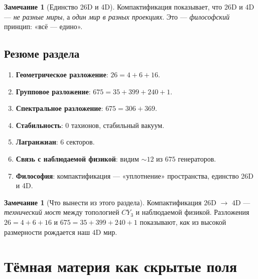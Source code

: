 \documentclass[11pt,a4paper]{article}
\newcommand{\CY}{CY_3}
\theoremstyle{definition}
\newtheorem{remark}[theorem]{Замечание}
\begin{document}
\begin{remark}[Единство 26D и 4D]
\label{rem:unity-26-4}
Компактификация показывает, что $26$D и $4$D — 
\emph{не разные миры}, а \emph{один мир в разных проекциях}. 
Это — \emph{философский} принцип: «всё — едино».
\end{remark}

\subsection{Резюме раздела}
\label{subsec:comp-summary}

\begin{enumerate}
    \item \textbf{Геометрическое разложение}: $26 = 4 + 6 + 16$.
    \item \textbf{Групповое разложение}: 
          $675 = 35 + 399 + 240 + 1$.
    \item \textbf{Спектральное разложение}: 
          $675 = 306 + 369$.
    \item \textbf{Стабильность}: $0$ тахионов, стабильный вакуум.
    \item \textbf{Лагранжиан}: $6$ секторов.
    \item \textbf{Связь с наблюдаемой физикой}: видим $\sim 12$ 
          из $675$ генераторов.
    \item \textbf{Философия}: компактификация — «уплотнение» 
          пространства, единство 26D и 4D.
\end{enumerate}

\begin{remark}[Что вынести из этого раздела]
\label{rem:comp-takeaway}
Компактификация $26$D $\to$ $4$D — \emph{технический мост} 
между топологией $\CY$ и наблюдаемой физикой. 
Разложения $26 = 4 + 6 + 16$ и $675 = 35 + 399 + 240 + 1$ 
показывают, \emph{как} из высокой размерности рождается 
наш $4$D мир.
\end{remark}

\section{Тёмная материя как скрытые поля}
\label{sec:dark}
\end{document}
